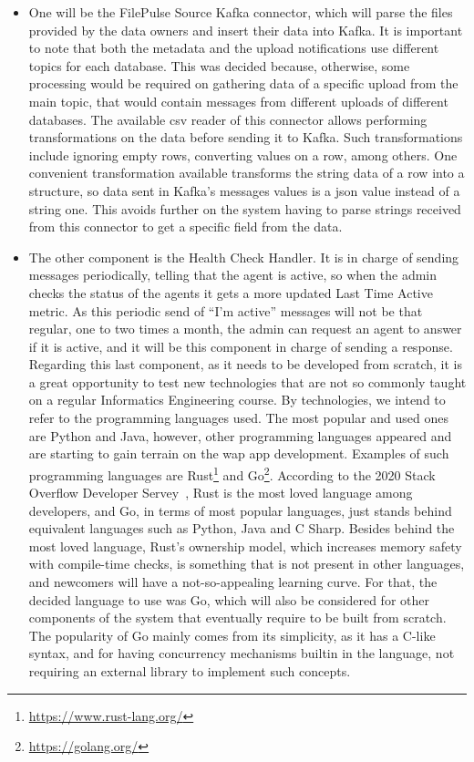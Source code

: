 \begin{itemize}
    \item One will be the FilePulse Source Kafka connector, which will parse the files provided by the data owners and insert their data into Kafka.
        It is important to note that both the metadata and the upload notifications use different topics for each database.
        This was decided because, otherwise, some processing would be required on gathering data of a specific upload from the main topic, that would contain messages from different uploads of different databases.
        The available \gls{csv} reader of this connector allows performing transformations on the data before sending it to Kafka.
        Such transformations include ignoring empty rows, converting values on a row, among others.
        One convenient transformation available transforms the string data of a row into a structure, so data sent in Kafka's messages values is a \gls{json} value instead of a string one.
        This avoids further on the system having to parse strings received from this connector to get a specific field from the data.

    \item The other component is the Health Check Handler.
        It is in charge of sending messages periodically, telling that the agent is active, so when the admin checks the status of the agents it gets a more updated Last Time Active metric.
        As this periodic send of ``I'm active'' messages will not be that regular, one to two times a month, the admin can request an agent to answer if it is active, and it will be this component in charge of sending a response.
        Regarding this last component, as it needs to be developed from scratch, it is a great opportunity to test new technologies that are not so commonly taught on a regular Informatics Engineering course.
        By technologies, we intend to refer to the programming languages used.
        The most popular and used ones are Python and Java, however, other programming languages appeared and are starting to gain terrain on the wap app development.
        Examples of such programming languages are Rust\footnote{\url{https://www.rust-lang.org/}} and Go\footnote{\url{https://golang.org/}}.
        According to the 2020 Stack Overflow Developer Servey~\cite{so-survey}, Rust is the most loved language among developers, and Go, in terms of most popular languages, just stands behind equivalent languages such as Python, Java and C Sharp.
        Besides behind the most loved language, Rust's ownership model, which increases memory safety with compile-time checks, is something that is not present in other languages, and newcomers will have a not-so-appealing learning curve.
        For that, the decided language to use was Go, which will also be considered for other components of the system that eventually require to be built from scratch.
        The popularity of Go mainly comes from its simplicity, as it has a C-like syntax, and for having concurrency mechanisms builtin in the language, not requiring an external library to implement such concepts.
\end{itemize}

